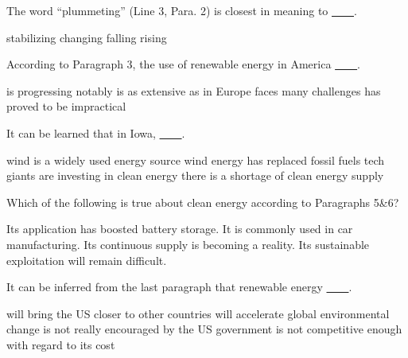 \item The word ``plummeting'' (Line 3, Para. 2) is closest in meaning to \uline{~~~~}.
\begin{tasks}
	\task stabilizing
	\task changing
	\task falling
	\task rising
\end{tasks}
\item According to Paragraph 3, the use of renewable energy in America \uline{~~~~}.
\begin{tasks}
	\task is progressing notably
	\task is as extensive as in Europe
	\task faces many challenges
	\task has proved to be impractical
\end{tasks}
\item It can be learned that in Iowa, \uline{~~~~}.
\begin{tasks}
	\task wind is a widely used energy source
	\task wind energy has replaced fossil fuels
	\task tech giants are investing in clean energy
	\task there is a shortage of clean energy supply
\end{tasks}
\item Which of the following is true about clean energy according to Paragraphs 5\&6?
\begin{tasks}
	\task Its application has boosted battery storage.
	\task It is commonly used in car manufacturing.
	\task Its continuous supply is becoming a reality.
	\task Its sustainable exploitation will remain difficult.\end{tasks}
\item It can be inferred from the last paragraph that renewable energy \uline{~~~~}.
\begin{tasks}
	\task will bring the US closer to other countries
	\task will accelerate global environmental change
	\task is not really encouraged by the US government
	\task is not competitive enough with regard to its cost
\end{tasks}